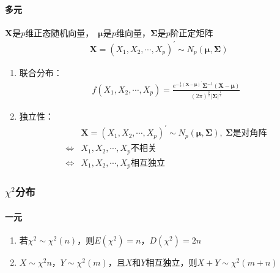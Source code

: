 \documentclass[12pt]{book}
\begin{document}
\paragraph{多元}

$\mathbf{X}$是$p$维正态随机向量，\ $\mathbf{\mu}$是$p$维向量，$\bm{\Sigma}$是$p$阶正定矩阵
\begin{gather*}
    \mathbf{X}
    = \left(X_1,X_2,\cdots,X_p\right)^\prime
    \sim N_p(\bm{\mu},\bm{\Sigma} )
\end{gather*}

\begin{enumerate}[1.]
    \item 联合分布：
    \begin{gather*}
        f(X_1,X_2,\cdots,X_p)
        = \frac{ 
            e^{ -\frac{1}{2}(\mathbf{X}-\bm{\mu})^\prime }
            \bm{\Sigma}^{-1}
            (\bm{X}-\bm{\mu})
        }{
            (2\pi)^{\frac{p}{2}}
            \left|\mathbf{\Sigma}\right|^{\frac{1}{2}}
        }
    \end{gather*}
    \item 独立性：
    \begin{align*}
        &\mathbf{X}=(X_1,X_2,\cdots,X_p)^\prime
        \sim N_p(\bm{\mu},\bm{\Sigma}),\ \bm{\Sigma} \text{是对角阵}\\
        \Leftrightarrow &X_1,X_2,\cdots,X_p \text{不相关}\\
        \Leftrightarrow &X_1,X_2,\cdots,X_p \text{相互独立}
    \end{align*}
\end{enumerate}






\subsubsection{$\chi^2$分布}


\paragraph{一元}

\begin{enumerate}[1.]
    \item 若$\chi^2\sim\chi^2(n)$，则$E(\chi^2)=n$，$D(\chi^2)=2n$
    \item $X\sim \chi^2{n}$，$Y\sim\chi^2(m)$，且$X$和$Y$相互独立，则$X+Y\sim\chi^2(m+n)$
\end{enumerate}
\end{document}
